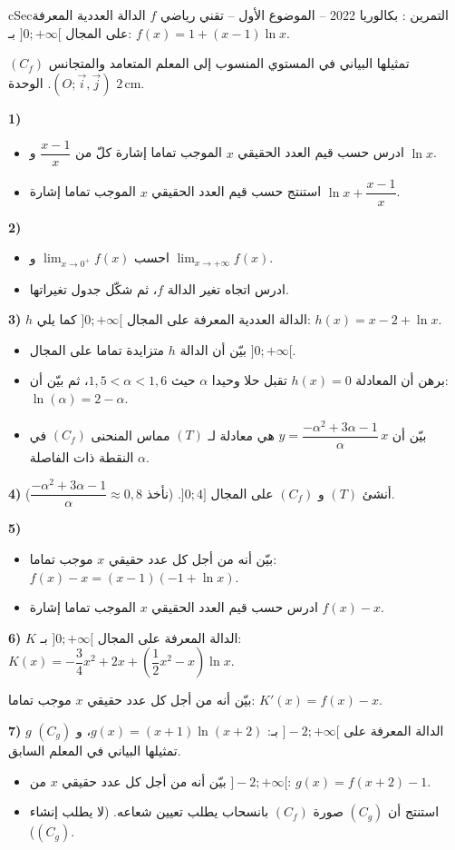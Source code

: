 \documentclass[12pt,a4paper]{article}
\newenvironment{BOX}[2]{\begin{otherlanguage}{english}\begin{arbox}{#1}{#2}}{\end{arbox}\end{otherlanguage}}
\newcounter{exo}
\newenvironment{tamrin}[1]{\stepcounter{exo}\begin{BOX}{cSec}{التمرين \theexo: #1}}{\end{BOX}}
\newenvironment{sq}{\begin{itemize}[leftmargin=2.4em,itemsep=3pt]}{\end{itemize}}
\newcommand{\qa}{\item[(أ)]}\newcommand{\qb}{\item[(ب)]}\newcommand{\qc}{\item[(جـ)]}\newcommand{\qd}{\item[(د)]}\newcommand{\qe}{\item[(هـ)]}
\begin{document}
\begin{tamrin}{بكالوريا 2022 -- الموضوع الأول -- تقني رياضي}
$f$ الدالة العددية المعرفة على المجال $]0;+\infty[$ بـ: $f(x)=1+(x-1)\ln x$.

$(C_f)$ تمثيلها البياني في المستوي المنسوب إلى المعلم المتعامد والمتجانس $(O;\vec i,\vec j)$. الوحدة $2\,\text{cm}$.

\textbf{1)}
\begin{sq}
\qa ادرس حسب قيم العدد الحقيقي $x$ الموجب تماما إشارة كلّ من $\dfrac{x-1}{x}$ و $\ln x$.
\qb استنتج حسب قيم العدد الحقيقي $x$ الموجب تماما إشارة $\ln x+\dfrac{x-1}{x}$.
\end{sq}
\textbf{2)}
\begin{sq}
\qa احسب $\displaystyle\lim_{x\to0^+}f(x)$ و $\displaystyle\lim_{x\to+\infty}f(x)$.
\qb ادرس اتجاه تغير الدالة $f$، ثم شكّل جدول تغيراتها.
\end{sq}
\textbf{3)} $h$ الدالة العددية المعرفة على المجال $]0;+\infty[$ كما يلي: $h(x)=x-2+\ln x$.
\begin{sq}
\qa بيّن أن الدالة $h$ متزايدة تماما على المجال $]0;+\infty[$.
\qb برهن أن المعادلة $h(x)=0$ تقبل حلا وحيدا $\alpha$ حيث $1{,}5<\alpha<1{,}6$، ثم بيّن أن: $\ln(\alpha)=2-\alpha$.
\qc بيّن أن $y=\dfrac{-\alpha^2+3\alpha-1}{\alpha}\,x$ هي معادلة لـ $(T)$ مماس المنحنى $(C_f)$ في النقطة ذات الفاصلة $\alpha$.
\end{sq}
\textbf{4)} أنشئ $(T)$ و $(C_f)$ على المجال $]0;4]$. (نأخذ $\dfrac{-\alpha^2+3\alpha-1}{\alpha}\approx0{,}8$).

\textbf{5)}
\begin{sq}
\qa بيّن أنه من أجل كل عدد حقيقي $x$ موجب تماما: $f(x)-x=(x-1)(-1+\ln x)$.
\qb ادرس حسب قيم العدد الحقيقي $x$ الموجب تماما إشارة $f(x)-x$.
\end{sq}
\textbf{6)} $K$ الدالة المعرفة على المجال $]0;+\infty[$ بـ: $K(x)=-\dfrac34x^2+2x+\left(\dfrac12x^2-x\right)\ln x$.

بيّن أنه من أجل كل عدد حقيقي $x$ موجب تماما: $K'(x)=f(x)-x$.

\textbf{7)} $g$ الدالة المعرفة على $]-2;+\infty[$ بـ: $g(x)=(x+1)\ln(x+2)$، و $(C_g)$ تمثيلها البياني في المعلم السابق.
\begin{sq}
\qa بيّن أنه من أجل كل عدد حقيقي $x$ من $]-2;+\infty[$: $g(x)=f(x+2)-1$.
\qb استنتج أن $(C_g)$ صورة $(C_f)$ بانسحاب يطلب تعيين شعاعه. (لا يطلب إنشاء $(C_g)$).
\end{sq}
\end{tamrin}
\end{document}
